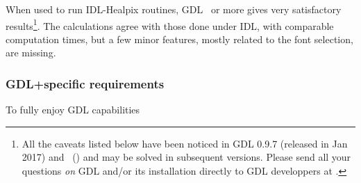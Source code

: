 \documentclass[12pt,twoside]{article}
\begin{document}
When used to run IDL-Healpix routines, GDL \gdlversion\ or more gives
very satisfactory results\footnote{All the caveats listed below have been noticed in
GDL 0.9.7 (released in Jan 2017) and 
\gdlversion\ (\gdlreldate) and may be solved in subsequent versions. Please send all your questions
{\em on} GDL and/or its installation directly to GDL developpers at 
.}. 
The calculations agree with those done under IDL, with
comparable computation times, but a few minor features, mostly related to the font selection, are missing.

\subsubsection*{GDL+\healpix specific requirements}
To fully enjoy GDL capabilities
\end{document}
